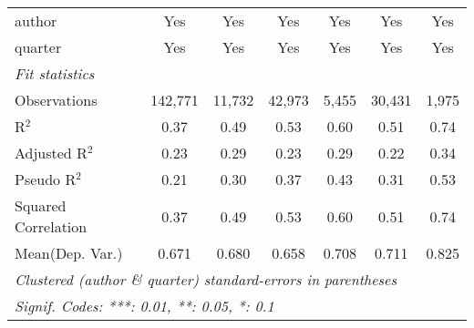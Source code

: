 \begin{tabular}{lcccccc}
   author                                                     & Yes           & Yes           & Yes           & Yes          & Yes           & Yes\\  
   quarter                                                    & Yes           & Yes           & Yes           & Yes          & Yes           & Yes\\  
   \midrule
   \emph{Fit statistics}\\
   Observations                                               & 142,771       & 11,732        & 42,973        & 5,455        & 30,431        & 1,975\\  
   R$^2$                                                      & 0.37          & 0.49          & 0.53          & 0.60         & 0.51          & 0.74\\  
   Adjusted R$^2$                                             & 0.23          & 0.29          & 0.23          & 0.29         & 0.22          & 0.34\\  
   Pseudo R$^2$                                               & 0.21          & 0.30          & 0.37          & 0.43         & 0.31          & 0.53\\  
   Squared Correlation                                        & 0.37          & 0.49          & 0.53          & 0.60         & 0.51          & 0.74\\  
Mean(Dep. Var.) & 0.671 & 0.680 & 0.658 & 0.708 & 0.711 & 0.825 \\
   \midrule \midrule
   \multicolumn{7}{l}{\emph{Clustered (author \& quarter) standard-errors in parentheses}}\\
   \multicolumn{7}{l}{\emph{Signif. Codes: ***: 0.01, **: 0.05, *: 0.1}}\\
\end{tabular}
\par\endgroup
